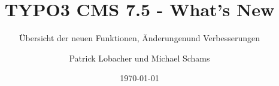 %

%
%

\documentclass[t]{beamer}

\beamertemplatenavigationsymbolsempty

{
	\usetheme{typo3slides}
}

\title{TYPO3 CMS 7.5 - What's New}
\subtitle{Übersicht der neuen Funktionen, Änderungen\newline und Verbesserungen}
\author{
	\centerline{Patrick Lobacher und Michael Schams}
}

\date{\today}



\sharefont


\begingroup
	[default]
	\begin{frame}
		\titlepage
	\end{frame}
\endgroup


\section*{TYPO3 CMS 7.5 - What's New}
\begin{frame}[fragile]
	\frametitle{Kapitelübersicht}
	\framesubtitle{Kapitelübersicht}

	\tableofcontents

\end{frame}


